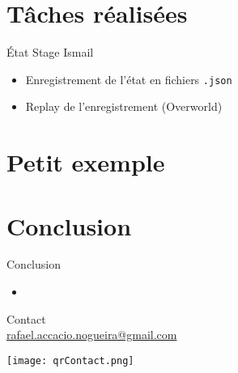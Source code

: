 \documentclass[aspectratio=169]{audition-beamer}
\begin{document}
\section{Tâches réalisées}
\begin{frame}{État}
Stage Ismail
\begin{itemize}
  \item Enregistrement de l'état en fichiers \texttt{.json}
  \item Replay de l'enregistrement (Overworld)
\end{itemize}
\end{frame}

\section{Petit exemple}

\section{Conclusion}

\begin{frame}{Conclusion}
  \begin{itemize}
    \item<+->
  \end{itemize}
\end{frame}

\begin{frame}[plain]
  \centering
  \vfill
  \begin{minipage}[t]{.5\linewidth}
    \small
    \centering
    Contact\\
    \href{mailto:rafael.accacio.nogueira@gmail.com?subject=Audition IMT-Atlantique 2024}{rafael.accacio.nogueira@gmail.com}

    \texttt{[image: qrContact.png]}
  \end{minipage}
  \fi
\end{frame}

\appendix
\end{document}
